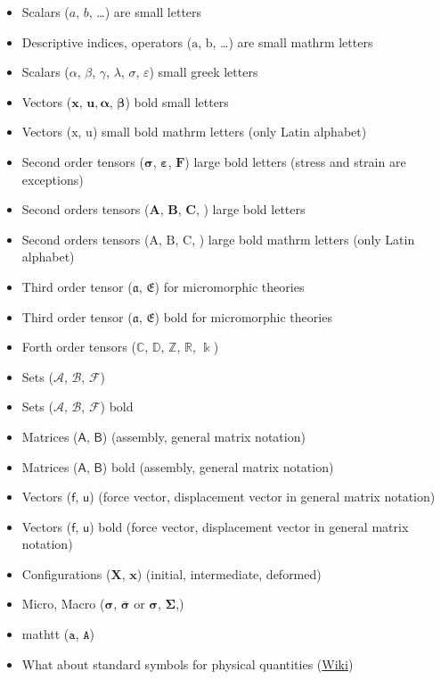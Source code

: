 \begin{itemize}
    \item Scalars ($a$, $b$, \dots) are small letters
    \item Descriptive indices, operators ($\mathrm{a}$, $\mathrm{b}$, \dots) are small mathrm letters
    \item Scalars ($\alpha$, $\beta$, $\gamma$, $\lambda$, $\sigma$, $\varepsilon$) small greek letters
    \item Vectors ($\boldsymbol{x}$, $\boldsymbol{u}$$, \boldsymbol{\alpha}$, $\boldsymbol{\beta}$) bold small letters
    \item Vectors ($\boldsymbol{\mathrm{x}}$, $\boldsymbol{\mathrm{u}}$) small bold mathrm letters (only Latin alphabet)
    \item Second order tensors ($\boldsymbol{\sigma}$, $\boldsymbol{\varepsilon}$, $\boldsymbol{F}$) large bold letters (stress and strain are exceptions)
    \item Second orders tensors ($\boldsymbol{A}$, $\boldsymbol{B}$, $\boldsymbol{C}$, ) large bold letters
    \item Second orders tensors ($\boldsymbol{\mathrm{A}}$, $\boldsymbol{\mathrm{B}}$, $\boldsymbol{\mathrm{C}}$, ) large bold mathrm letters (only Latin alphabet)
    \item Third order tensor ($\mathfrak{a}$, $\mathfrak{E}$) for micromorphic theories 
    \item Third order tensor ($\boldsymbol{\mathfrak{a}}$, $\boldsymbol{\mathfrak{E}}$) bold for micromorphic theories 
    \item Forth order tensors ($\mathbb{C}$, $\mathbb{D}$, $\mathbb{Z}$, $\mathbb{R}$, $\Bbbk$)
    \item Sets ($\mathcal{A}$, $\mathcal{B}$, $\mathcal{F}$)
    \item Sets ($\boldsymbol{\mathcal{A}}$, $\boldsymbol{\mathcal{B}}$, $\boldsymbol{\mathcal{F}}$) bold
    \item Matrices ($\mathsf{A}$, $\mathsf{B}$) (assembly, general matrix notation)
    \item Matrices ($\boldsymbol{\mathsf{A}}$, $\boldsymbol{\mathsf{B}}$) bold (assembly, general matrix notation)
    \item Vectors ($\mathsf{f}$, $\mathsf{u}$) (force vector, displacement vector in general matrix notation)
    \item Vectors ($\boldsymbol{\mathsf{f}}$, $\boldsymbol{\mathsf{u}}$) bold (force vector, displacement vector in general matrix notation)
    \item Configurations ($\boldsymbol{X}$, $\boldsymbol{x}$) (initial, intermediate, deformed)
    \item Micro, Macro ($\boldsymbol{\sigma}$, $\bar{\boldsymbol{\sigma}}$ or $\boldsymbol{\sigma}$, $\boldsymbol{\Sigma}$,)
    \item mathtt ($\mathtt{a}$, $\mathtt{A}$)
    \item What about standard symbols for physical quantities (\href{https://en.wikipedia.org/wiki/List_of_physical_quantities}{Wiki})
\end{itemize}

